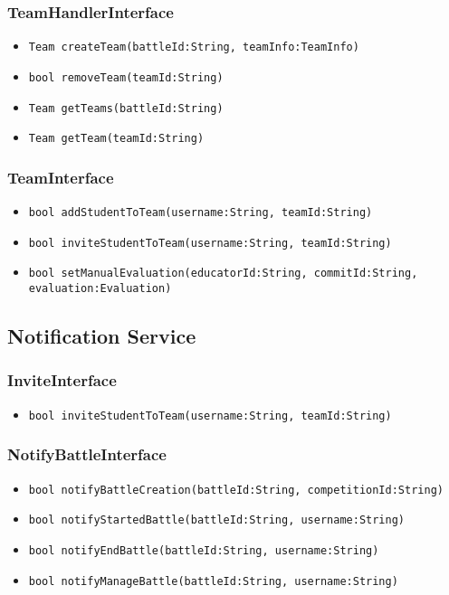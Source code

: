 \subsubsection{TeamHandlerInterface}
\begin{itemize}
    \item \texttt{Team createTeam(battleId:String, teamInfo:TeamInfo)}
    \item \texttt{bool removeTeam(teamId:String)}
    \item \texttt{Team getTeams(battleId:String)}%
    \item \texttt{Team getTeam(teamId:String)}%
\end{itemize}

\subsubsection{TeamInterface}
\begin{itemize}
    \item \texttt{bool addStudentToTeam(username:String, teamId:String)}%
    \item \texttt{bool inviteStudentToTeam(username:String, teamId:String)}%
    \item \texttt{bool setManualEvaluation(educatorId:String, commitId:String,\\evaluation:Evaluation)}%
\end{itemize}


\subsection{Notification Service}
\subsubsection{InviteInterface}
\begin{itemize}
    \item \texttt{bool inviteStudentToTeam(username:String, teamId:String)}%
\end{itemize}

\subsubsection{NotifyBattleInterface}
\begin{itemize}
    \item \texttt{bool notifyBattleCreation(battleId:String, competitionId:String)}%
    \item \texttt{bool notifyStartedBattle(battleId:String, username:String)}
    \item \texttt{bool notifyEndBattle(battleId:String, username:String)}
    \item \texttt{bool notifyManageBattle(battleId:String, username:String)}
\end{itemize}

